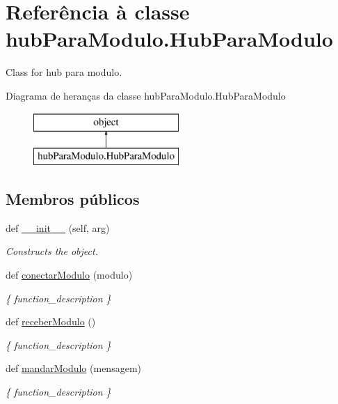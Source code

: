 \hypertarget{classhub_para_modulo_1_1_hub_para_modulo}{}\section{Referência à classe hub\+Para\+Modulo.\+Hub\+Para\+Modulo}
\label{classhub_para_modulo_1_1_hub_para_modulo}


Class for hub para modulo.  


Diagrama de heranças da classe hub\+Para\+Modulo.\+Hub\+Para\+Modulo\begin{figure}[H]
\begin{center}
\leavevmode
\includegraphics[height=2.000000cm]{classhub_para_modulo_1_1_hub_para_modulo}
\end{center}
\end{figure}
\subsection*{Membros públicos}
\begin{DoxyCompactItemize}
\item 
def \hyperlink{classhub_para_modulo_1_1_hub_para_modulo_abf63ddad3857ffe2c53bfa707a149c75}{\+\_\+\+\_\+init\+\_\+\+\_\+} (self, arg)
\begin{DoxyCompactList}\small\item\em Constructs the object. \end{DoxyCompactList}\item 
def \hyperlink{classhub_para_modulo_1_1_hub_para_modulo_a900479a98a6654264db5ae768070c57d}{conectar\+Modulo} (modulo)
\begin{DoxyCompactList}\small\item\em \{ function\+\_\+description \} \end{DoxyCompactList}\item 
def \hyperlink{classhub_para_modulo_1_1_hub_para_modulo_af13d34db03264f5039697c7ca64c5d48}{receber\+Modulo} ()
\begin{DoxyCompactList}\small\item\em \{ function\+\_\+description \} \end{DoxyCompactList}\item 
def \hyperlink{classhub_para_modulo_1_1_hub_para_modulo_a3b77e329ad83e2a107f0125332d92486}{mandar\+Modulo} (mensagem)
\begin{DoxyCompactList}\small\item\em \{ function\+\_\+description \} \end{DoxyCompactList}\end{DoxyCompactItemize}
